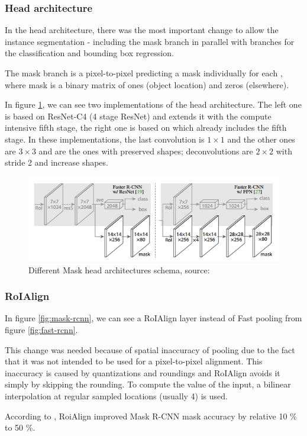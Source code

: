 \subsubsection{Head architecture}
\label{head}

In the head architecture, there was the most important change to allow the instance segmentation - including the mask branch in parallel with branches for the classification and bounding box regression. 

The mask branch is a pixel-to-pixel  predicting a mask individually for each , where mask is a binary matrix of ones (object location) and zeros (elsewhere).

In figure \ref{fig:head}, we can see two implementations of the head architecture. The left one is based on ResNet-C4 (4 stage ResNet) and extends it with the compute intensive fifth stage, the right one is based on  which already includes the fifth stage. In these implementations, the last convolution is $1 \times 1$ and the other ones are $3 \times 3$ and are the ones with preserved shapes; deconvolutions are $2 \times 2$ with stride 2 and increase shapes. 

\begin{figure}[H]
   \centering
	\includegraphics[width=0.7\linewidth]{./pictures/maskrcnn-head.png}
	\caption[Mask R-CNN head architecture]{Different Mask  head architectures schema, source: \cite{mask-rcnn}}
      \label{fig:head}
\end{figure}

\subsubsection{RoIAlign}
\label{roialign}

In figure \ref{fig:mask-rcnn}, we can see a RoIAlign layer instead of Fast   pooling from figure \ref{fig:fast-rcnn}.

This change was needed because of spatial inaccuracy of  pooling due to the fact that it was not intended to be used for a pixel-to-pixel alignment. This inaccuracy is caused by quantizations and roundings and RoIAlign avoids it simply by skipping the rounding. To compute the value of the input, a bilinear interpolation at regular sampled locations (usually 4) is used.

According to \cite{mask-rcnn}, RoiAlign improved Mask R-CNN mask accuracy by relative 10 \% to 50 \%.


